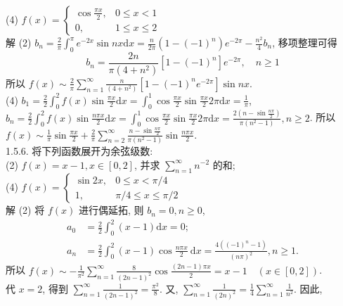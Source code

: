 \documentclass[a4paper,11pt,UTF8]{article}
\begin{document}
(4) $\displaystyle f(x)= \begin{cases}\displaystyle \cos \frac{\pi x}{2}, &\displaystyle  0 \leq x<1 \\ 0, &\displaystyle  1 \leq x \leq 2\end{cases}$\\
解 (2) $\displaystyle b_n=\frac{2}{\pi} \int_0^\pi e^{-2 x} \sin n x \mathrm{d}x=\frac{n}{2 \pi}\left(1-(-1)^n\right) e^{-2 \pi}-\frac{n^2}{4} b_n$,
移项整理可得
$$
b_n=\frac{2 n}{\pi\left(4+n^2\right)}\left[1-(-1)^n\right] e^{-2 \pi}, \quad n \geq 1
$$
所以 $\displaystyle f(x) \sim \frac{2}{\pi} \sum_{n=1}^{\infty} \frac{n}{\left(4+n^2\right)}\left[1-(-1)^n e^{-2 \pi}\right] \sin n x$.\\
(4) $\displaystyle b_1=\frac{2}{2} \int_0^2 f(x) \sin \frac{\pi x}{2} \mathrm{d}x=\int_0^1 \cos \frac{\pi x}{2} \sin \frac{\pi x}{2} 2 \pi \mathrm{d}x=\frac{1}{\pi}$,
$\displaystyle b_n=\frac{2}{2} \int_0^2 f(x) \sin \frac{n \pi x}{2} \mathrm{d}x=\int_0^1 \cos \frac{\pi x}{2} \sin \frac{\pi x}{2} 2 \pi \mathrm{d}x=\frac{2\left(n-\sin \frac{n \pi}{2}\right)}{\pi\left(n^2-1\right)}, n \geq 2$.
所以 $\displaystyle f(x) \sim \frac{1}{\pi} \sin \frac{\pi x}{2}+\frac{2}{\pi} \sum_{n=2}^{\infty} \frac{n-\sin \frac{n \pi}{2}}{\pi\left(n^2-1\right)} \sin \frac{n \pi x}{2}$.\\
1.5.6. 将下列函数展开为余弦级数:\\
(2) $\displaystyle f(x)=x-1, x \in[0,2]$, 并求 $\displaystyle \sum_{n=1}^{\infty} n^{-2}$ 的和;\\
(4) $\displaystyle f(x)= \begin{cases}\sin 2 x, & 0 \leq x<\pi / 4 \\ 1, & \pi / 4 \leq x \leq \pi / 2\end{cases}$\\
解 (2) 将 $\displaystyle f(x)$ 进行偶延拓, 则 $b_n=0, n \geq 0$,
$$
\begin{aligned}
	a_0 & =\frac{2}{2} \int_0^2(x-1) \mathrm{d} x=0 ; \\
	a_n & =\frac{2}{2} \int_0^2(x-1) \cos \frac{n \pi x}{2} \mathrm{~d} x=\frac{4\left((-1)^n-1\right)}{(n \pi)^2}, n \geq 1 .
\end{aligned}
$$
所以 $\displaystyle f(x) \sim-\frac{1}{\pi^2} \sum_{n=1}^{\infty} \frac{8}{(2 n-1)^2} \cos \frac{(2 n-1) \pi x}{2}=x-1 \quad(x \in[0,2])$.\\
代 $x=2$, 得到 $\displaystyle \sum_{n=1}^{\infty} \frac{1}{(2 n-1)^2}=\frac{\pi^2}{8}$. 又, $\displaystyle \sum_{n=1}^{\infty} \frac{1}{(2 n)^2}=\frac{1}{4} \sum_{n=1}^{\infty} \frac{1}{n^2}$. 因此,
\end{document}
